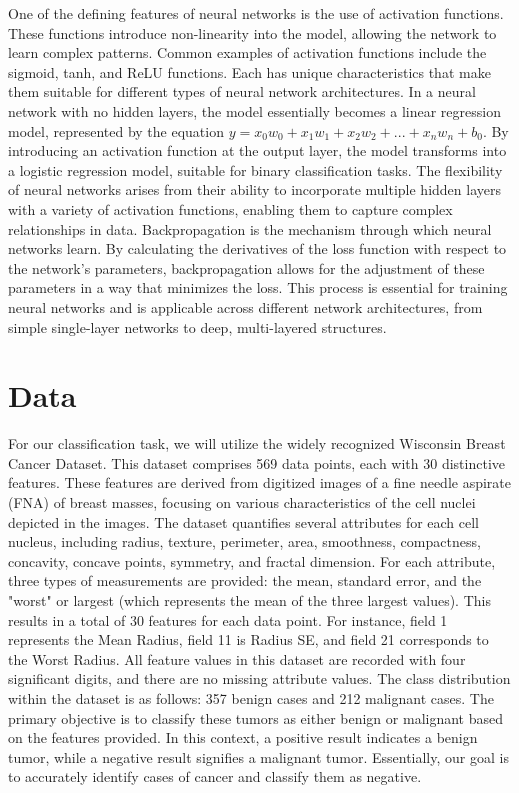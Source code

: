 \documentclass[twoside,11pt]{report}
\begin{document}
    One of the defining features of neural networks is the use of activation functions. These functions introduce 
    non-linearity into the model, allowing the network to learn complex patterns. Common examples of activation 
    functions include the sigmoid, tanh, and ReLU functions. Each has unique characteristics that make them suitable 
    for different types of neural network architectures.
    In a neural network with no hidden layers, the model essentially becomes a linear regression model, represented by 
    the equation $y = x_0w_0 + x_1w_1 + x_2w_2 + ... + x_nw_n + b_0$. By introducing an activation function at the 
    output layer, the model transforms into a logistic regression model, suitable for binary classification tasks. 
    The flexibility of neural networks arises from their ability to incorporate multiple hidden layers with a variety 
    of activation functions, enabling them to capture complex relationships in data.
    Backpropagation is the mechanism through which neural networks learn. By calculating the derivatives of the loss 
    function with respect to the network's parameters, backpropagation allows for the adjustment of these parameters 
    in a way that minimizes the loss. This process is essential for training neural networks and is applicable across 
    different network architectures, from simple single-layer networks to deep, multi-layered structures.




\section{Data}
\label{sec:data}

    For our classification task, we will utilize the widely recognized Wisconsin Breast Cancer 
    Dataset\cite{misc_breast_cancer17}. This dataset comprises 569 data points, 
    each with 30 distinctive features. 
    These features are derived from digitized images of a fine needle aspirate (FNA) of breast masses, focusing on 
    various characteristics of the cell nuclei depicted in the images.
    The dataset quantifies several attributes for each cell nucleus, including radius, texture, perimeter, area, 
    smoothness, compactness, concavity, concave points, symmetry, and fractal dimension. For each attribute, three 
    types of measurements are provided: the mean, standard error, and the "worst" or largest (which represents the 
    mean of the three largest values). This results in a total of 30 features for each data point. For instance, 
    field 1 represents the Mean Radius, field 11 is Radius SE, and field 21 corresponds to the Worst Radius.
    All feature values in this dataset are recorded with four significant digits, and there are no missing attribute 
    values. The class distribution within the dataset is as follows: 357 benign cases and 212 malignant cases.
    The primary objective is to classify these tumors as either benign or malignant based on the features provided. 
    In this context, a positive result indicates a benign tumor, while a negative result signifies a malignant tumor. 
    Essentially, our goal is to accurately identify cases of cancer and classify them as negative.
\end{document}

